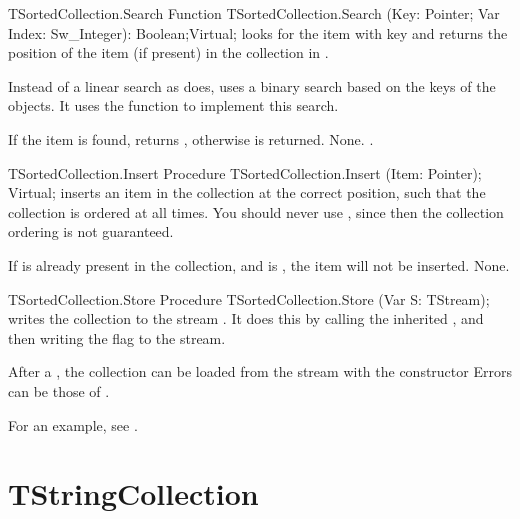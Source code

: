 

\begin{function}{TSortedCollection.Search}
\Declaration
Function TSortedCollection.Search (Key: Pointer; Var Index: Sw\_Integer): Boolean;Virtual;
\Description
{} looks for the item with key  and returns the position 
of the item (if present) in the collection in .

Instead of a linear search as  does, 
uses a binary search based on the keys of the objects. It uses the
 function to implement this
search. 

If the item is found,  returns , otherwise 
is returned.
\Errors
None.
\SeeAlso
{}.
\end{function}



\begin{procedure}{TSortedCollection.Insert}
\Declaration
Procedure TSortedCollection.Insert (Item: Pointer); Virtual;
\Description
{} inserts an item in the collection at the correct position, such
that the collection is ordered at all times. You should never use
, since then the collection ordering
is not guaranteed.

If  is already present in the collection, and  is
, the item will not be inserted.
\Errors
None.
\SeeAlso
{}
\end{procedure}



\begin{procedure}{TSortedCollection.Store}
\Declaration
Procedure TSortedCollection.Store (Var S: TStream);
\Description
{} writes the collection to the stream . It does this by
calling the inherited , and then writing the
 flag to the stream.

After a , the collection can be loaded from the stream with the 
constructor 
\Errors
Errors can be those of .
\SeeAlso
{}
\end{procedure}

For an example, see .

\section{TStringCollection}
\label{se:TStringCollection}

